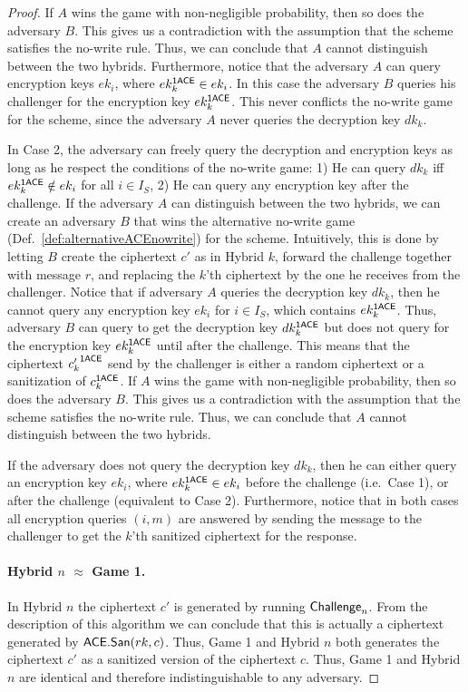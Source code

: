 \documentclass{llncs}
\begin{document}
\begin{proof}
If $A$ wins the game with non-negligible probability, then so does the adversary $B$. This gives us a contradiction with the assumption that the \oACE scheme satisfies the no-write rule. Thus, we can conclude that $A$ cannot distinguish between the two hybrids.
Furthermore, notice that the adversary $A$ can query encryption keys $ek_i$, where $ek_k^{\mathsf{1ACE}} \in ek_i$. In this case the adversary $B$  queries his challenger for the encryption key $ek_k^{\mathsf{1ACE}}$. This  never conflicts the no-write game for the \oACE scheme, since the adversary $A$ never queries the decryption key $dk_k$. 

In Case 2, the adversary can freely query the decryption and encryption keys as long as he respect the conditions of the no-write game: 1) He can query $dk_k$ iff $ek_k^{\mathsf{1ACE}} \notin ek_i$ for all $i \in I_S$, 2) He can query any encryption key after the challenge.
If the adversary $A$ can distinguish between the two hybrids, we can create an adversary $B$ that wins the alternative no-write game (Def.~\ref{def:alternativeACEnowrite}) for the \oACE scheme. 
Intuitively, this is done by letting $B$ create the ciphertext $c'$ as in Hybrid $k$, forward the challenge together with message $r$, and replacing the $k$'th \oACE ciphertext by the one he receives from the challenger.
Notice that if adversary $A$ queries the decryption key $dk_k$, then he cannot query any encryption key $ek_i$ for $i \in I_S$, which contains $ek_k^{\mathsf{1ACE}}$. 
Thus, adversary $B$ can query to get the decryption key $dk_k^{\mathsf{1ACE}}$ but does not query for the encryption key $ek_k^{\mathsf{1ACE}}$ until after the challenge.
This means that the \oACE ciphertext ${c'_k}^{\mathsf{1ACE}}$ send by the challenger is either a random \oACE ciphertext or a sanitization of $c_k^{\mathsf{1ACE}}$.
If $A$ wins the game with non-negligible probability, then so does the adversary $B$. This gives us a contradiction with the assumption that the \oACE scheme satisfies the no-write rule. Thus, we can conclude that $A$ cannot distinguish between the two hybrids.

If the adversary does not query the decryption key $dk_k$, then he can either query an encryption key $ek_i$, where $ek_k^{\mathsf{1ACE}} \in ek_i$ before the challenge (i.e.~Case 1), or after the challenge (equivalent to Case 2). 
Furthermore, notice that in both cases all encryption queries $(i,m)$ are answered by sending the message to the challenger to get the $k$'th \oACE sanitized ciphertext for the response. 

\paragraph{Hybrid $n$ $\approx$ Game 1.} 
In Hybrid $n$ the ciphertext $c'$ is generated by running $\mathsf{Challenge}_n$. From the description of this algorithm we can conclude that this is actually a ciphertext generated by $\mathsf{ACE}.\mathsf{San}(rk,c)$. Thus, Game 1 and Hybrid $n$ both generates the ciphertext $c'$ as a sanitized version of the ciphertext $c$. Thus, Game 1 and Hybrid $n$ are identical and therefore indistinguishable to any adversary.



\end{proof}
\end{document}
